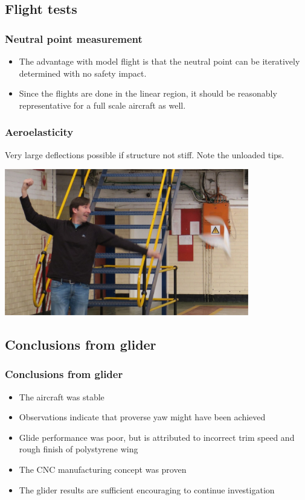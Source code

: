 \documentclass{beamer}
\begin{document}
\subsection{Flight tests}




\begin{frame}
\frametitle{Neutral point measurement}

\begin{itemize}
\item The advantage with model flight is that the neutral point can be iteratively determined with no safety impact.
\item Since the flights are done in the linear region, it should be reasonably representative for a full scale aircraft as well.
\end{itemize}

\end{frame}



\begin{frame}
\frametitle{Aeroelasticity}

Very large deflections possible if structure not stiff.  Note the unloaded tips.

\includegraphics[width = 0.8\textwidth]{Pictures/MassiveDeflect.JPG}

\end{frame}

\subsection{Conclusions from glider}

\begin{frame}
\frametitle{Conclusions from glider}

\begin{itemize}
\item The aircraft was stable
\item Observations indicate that proverse yaw might have been achieved
\item Glide performance was poor, but is attributed to incorrect trim speed and rough finish of polystyrene wing
\item The CNC manufacturing concept was proven
\item The glider results are sufficient encouraging to continue investigation
\end{itemize}

\end{frame}
\end{document}
